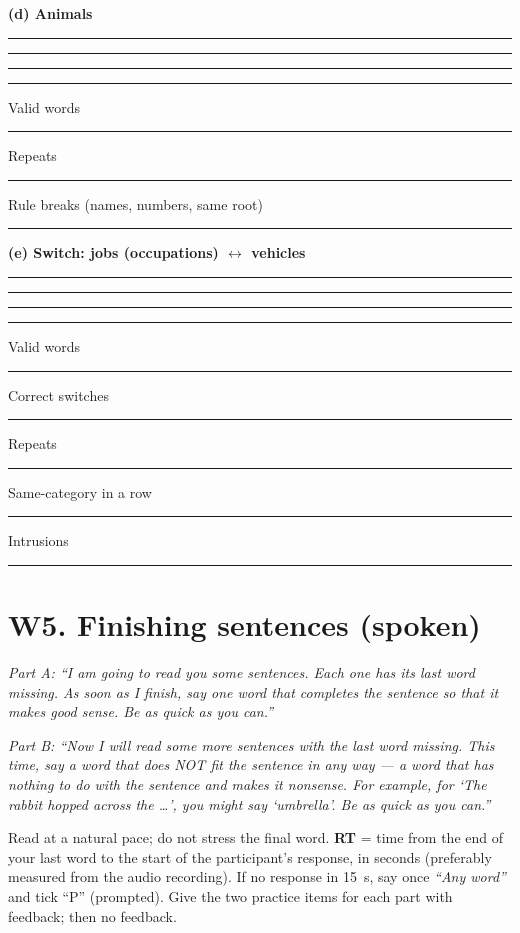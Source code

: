 \documentclass[10pt,a4paper]{article}
\newcommand{\blank}[1][1.2cm]{\rule{#1}{0.4pt}}
\begin{document}
\par{}\medskip\textbf{(d) Animals}\par\vspace{2pt}\blank[\linewidth]\par\vspace{9pt}\blank[\linewidth]\par\vspace{9pt}\blank[\linewidth]\par\vspace{9pt}\blank[\linewidth]\par\vspace{9pt}
Valid words \blank\quad Repeats \blank\quad Rule breaks (names, numbers, same root) \blank\par
\par{}\medskip\textbf{(e) Switch: jobs (occupations) $\leftrightarrow$ vehicles}\par\vspace{2pt}\blank[\linewidth]\par\vspace{9pt}\blank[\linewidth]\par\vspace{9pt}\blank[\linewidth]\par\vspace{9pt}\blank[\linewidth]\par\vspace{9pt}
Valid words \blank\quad Correct switches \blank\quad Repeats \blank\quad Same-category in a row \blank\quad Intrusions \blank\par
\section*{W5. Finishing sentences (spoken)}
\textit{Part A: ``I am going to read you some sentences. Each one has its last word missing. As soon as I finish, say one word that completes the sentence so that it makes good sense. Be as quick as you can.''}

\textit{Part B: ``Now I will read some more sentences with the last word missing. This time, say a word that does NOT fit the sentence in any way --- a word that has nothing to do with the sentence and makes it nonsense. For example, for `The rabbit hopped across the \ldots', you might say `umbrella'. Be as quick as you can.''}

Read at a natural pace; do not stress the final word. \textbf{RT} = time from the end of your last word to the start of the participant's response, in seconds (preferably measured from the audio recording). If no response in 15~s, say once \textit{``Any word''} and tick ``P'' (prompted). Give the two practice items for each part with feedback; then no feedback.
\end{document}
